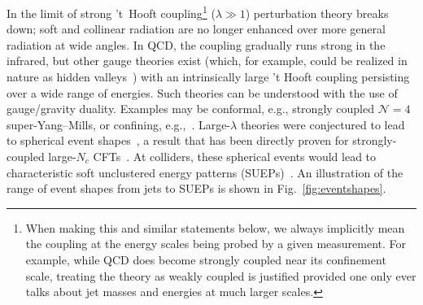 \begin{enumerate}
In the limit of strong 't~Hooft coupling\footnote{When making this and similar statements below, we always implicitly mean the coupling at the energy scales being probed by a given measurement. For example, while QCD does become strongly coupled near its confinement scale, treating the theory as weakly coupled is justified provided one only ever talks about jet masses and energies at much larger scales.} ($\lambda \gg 1$) perturbation theory breaks down; soft and collinear radiation are no longer enhanced over more general radiation at wide angles. In QCD, the coupling gradually runs strong in the infrared, but other gauge theories exist (which, for example, could  be realized in nature as hidden valleys~\cite{Strassler:2006im}) with an intrinsically large 't Hooft coupling persisting over a wide range of energies. Such theories can be understood with the use of gauge/gravity duality. Examples may be conformal, e.g., strongly coupled $\mathcal{N} = 4$ super-Yang--Mills, or confining, e.g.,~\cite{Polchinski:2000uf, Klebanov:2000hb}. Large-$\lambda$ theories were conjectured to lead to spherical event shapes~\cite{Strassler:2008bv}, a result that has been directly proven for strongly-coupled large-$N_c$ CFTs~\cite{Hofman:2008ar}. At colliders, these spherical events would lead to characteristic soft unclustered energy patterns (SUEPs)~\cite{Kang:2008ea, Harnik:2008ax, Knapen:2016hky}. An illustration of the range of event shapes from jets to SUEPs is shown in Fig.~\ref{fig:eventshapes}.


\end{enumerate}
